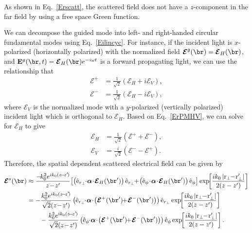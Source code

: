 As shown in Eq.~\ref{Erscatt}, the scattered field does not have a $ z $-component in the far field by using a free space Green function. 

We can decompose the guided mode into left- and right-handed circular fundamental modes using Eq.~\ref{Eilincyc}. For instance, if the incident light is $ x $-polarized (horizontally polarized) with the normalized field $ \boldsymbol{\mathcal{E}}^g (\br)=\boldsymbol{\mathcal{E}}_H (\br) $, and $ \mathbf{E}^g (\br,t) = \boldsymbol{\mathcal{E}}_H(\br)e^{-i\omega t} $ is a forward propagating light, we can use the relationship that
\begin{subequations}
\label{ErPMHV}
\begin{align}
\boldsymbol{\mathcal{E}}^+ &= \frac{1}{\sqrt{2}} \left(\boldsymbol{\mathcal{E}}_H+i\boldsymbol{\mathcal{E}}_V \right),\\
\boldsymbol{\mathcal{E}}^- &= \frac{1}{\sqrt{2}} \left( \boldsymbol{\mathcal{E}}_H-i\boldsymbol{\mathcal{E}}_V \right),
\end{align}
\end{subequations}
where $ \boldsymbol{\mathcal{E}}_V $ is the normalized mode with a $ y $-polarized (vertically polarized) incident light which is orthogonal to $ \boldsymbol{\mathcal{E}}_H $. Based on Eq.~\ref{ErPMHV}, we can solve for $ \boldsymbol{\mathcal{E}}_H $ to give
\begin{align}
\boldsymbol{\mathcal{E}}_H &= \frac{1}{\sqrt{2}} \left(\boldsymbol{\mathcal{E}}^+ + \boldsymbol{\mathcal{E}}^- \right),\\
\boldsymbol{\mathcal{E}}_V &= \frac{i}{\sqrt{2}} \left( \boldsymbol{\mathcal{E}}^- -\boldsymbol{\mathcal{E}}^+ \right). 
\end{align}
Therefore, the spatial dependent scattered electrical field can be given by
\begin{align}
\boldsymbol{\mathcal{E}}^s(\br) &\approx  \frac{-\!k_0^2 e^{ik_0(z\!-\!z'\!)}}{z\!-\!z'}\! \left[\left(\hat{\mathrm{e}}_{r_\perp} \!\!\cdot\! \boldsymbol{\alpha}\!\cdot\! \boldsymbol{\mathcal{E}}_H(\br')\right)\hat{\mathrm{e}}_{r_\perp} \!\!  +\! \left(\hat{\mathrm{e}}_\phi\!\cdot\! \boldsymbol{\alpha}\!\cdot\! \boldsymbol{\mathcal{E}}_H(\br') \right)\hat{\mathrm{e}}_\phi \right] \exp\!\! \left[ \frac{ik_0 \left| \mathrm{r}_\perp\!\! -\! \mathrm{r}_\perp'\right|}{2(z-z')}  \right]\\
&= - \frac{k_0^2 e^{ik_0(z\!-\!z'\!)}}{\sqrt{2}(z\!-\!z')} \left(\hat{\mathrm{e}}_{r_\perp} \!\!\cdot\! \boldsymbol{\alpha}\!\cdot\! \left(\boldsymbol{\mathcal{E}}^+ (\br') \!\! +\! \boldsymbol{\mathcal{E}}^- (\br') \right)\right)\hat{\mathrm{e}}_{r_\perp}  \exp\!\! \left[ \frac{ik_0 \left| \mathrm{r}_\perp\!\! -\! \mathrm{r}_\perp'\right|}{2(z-z')}  \right] \nonumber\\
&\qquad - \frac{k_0^2 e^{ik_0(z\!-\!z'\!)}}{\sqrt{2}(z\!-\!z')} \left(\hat{\mathrm{e}}_{\phi} \!\!\cdot\! \boldsymbol{\alpha}\!\cdot\! \left(\boldsymbol{\mathcal{E}}^+ (\br') \!\! +\! \boldsymbol{\mathcal{E}}^- (\br') \right)\right)\hat{\mathrm{e}}_{\phi}  \exp\!\! \left[ \frac{ik_0 \left| \mathrm{r}_\perp\!\! -\! \mathrm{r}_\perp'\right|}{2(z-z')}  \right]. \label{Ers0}
\end{align}
